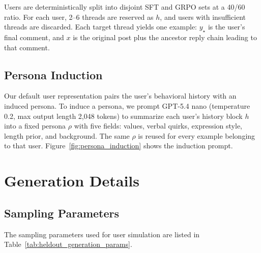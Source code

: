 \documentclass[11pt]{article}
\begin{document}
Users are deterministically split into disjoint SFT and GRPO sets at a 40/60 ratio.
For each user, 2--6 threads are reserved as $h$, and users with insufficient threads are discarded. Each target thread yields one example: $y_{\star}$ is the user's final comment, and $x$ is the original post plus the ancestor reply chain leading to that comment.






\subsection{Persona Induction}

Our default user representation pairs the user's behavioral history with an induced persona. To induce a persona, we prompt GPT-5.4 nano (temperature 0.2, max output length 2{,}048 tokens) to summarize each user's history block $h$ into a fixed persona $\rho$ with five fields: values, verbal quirks, expression style, length prior, and background. The same $\rho$ is reused for every example belonging to that user. Figure~\ref{fig:persona_induction} shows the induction prompt.



\section{Generation Details}\label{sec:sampling_params}
\subsection{Sampling Parameters}
The sampling parameters used for user simulation are listed in Table~\ref{tab:heldout_generation_params}.
\end{document}

